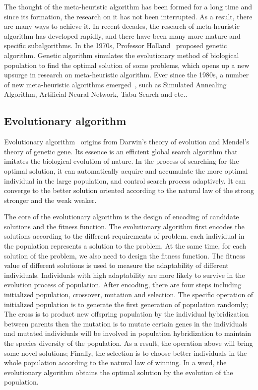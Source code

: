 The thought of the meta-heuristic algorithm has been formed for a long time 
and since its formation, the research on it has not been interrupted. As a 
result, there are many ways to achieve it. In recent decades, the research of 
meta-heuristic algorithm has developed rapidly, and there have been many more 
mature and specific subalgorithms. In the 1970s, Professor Holland~\cite{holland} 
proposed genetic algorithm. Genetic algorithm simulates the 
evolutionary method of biological population to find the optimal solution of 
some problems, which opens up a new upsurge in research on meta-heuristic 
algorithm. Ever since the 1980s, a number of new meta-heuristic algorithms emerged~\cite{harman}, 
such as Simulated Annealing Algorithm, Artificial Neural Network, Tabu Search 
and etc.. 




\subsection{Evolutionary algorithm}

Evolutionary algorithm~\cite{deb} origins from Darwin's theory of evolution and Mendel's 
theory of genetic gene. Its essence is an efficient global search algorithm 
that imitates the biological evolution of nature. In the process of searching 
for the optimal solution, it can automatically acquire and accumulate the 
more optimal individual in the large population, and control search process 
adaptively. It can converge to the better solution oriented according to the 
natural law of the strong stronger and the weak weaker.


The core of the evolutionary algorithm is the design of encoding of candidate
solutions and the fitness function. The evolutionary algorithm first encodes the
solutions according to the different requirements of problem. each individual in
the population represents a solution to the problem. At the same time, for each
solution of the problem, we also need to design the fitness function. The
fitness value of different solutions is used to measure the adaptability of
different individuals. Individuals with high adaptability are more likely to
survive in the evolution process of population. After encoding, there are four
steps including initialized population, crossover, mutation and selection. The
specific operation of initialized population is to generate the first generation
of population randomly; The cross is to product new offspring population by the
individual hybridization between parents then the mutation is to mutate certain
genes in the individuals and mutated individuals will be involved in population
hybridization to maintain the species diversity of the population. As a result,
the operation above will bring some novel solutions; Finally, the selection is
to choose better individuals in the whole population according to the natural
law of winning.  In a word, the evolutionary algorithm obtains the optimal
solution by the evolution of the population.



